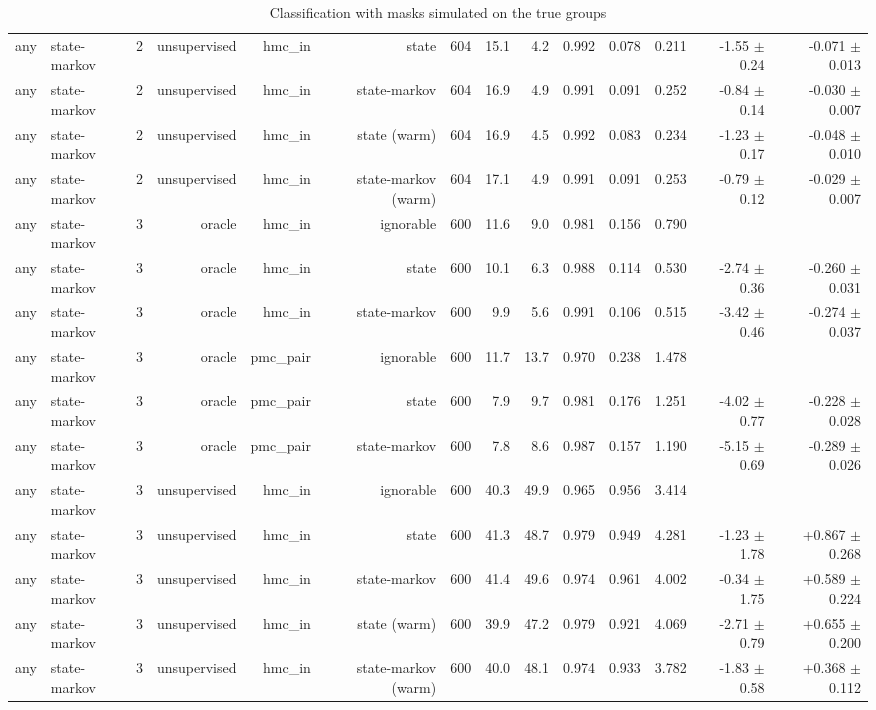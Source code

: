 \begin{table}[ht]
\begin{tabular}{llrrrrrrrrrrrr}
any & state-markov & 2 & unsupervised & hmc\_in & state & 604 & 15.1 & 4.2 & 0.992 & 0.078 & 0.211 & -1.55 $\pm$ 0.24 & -0.071 $\pm$ 0.013 \\
any & state-markov & 2 & unsupervised & hmc\_in & state-markov & 604 & 16.9 & 4.9 & 0.991 & 0.091 & 0.252 & -0.84 $\pm$ 0.14 & -0.030 $\pm$ 0.007 \\
any & state-markov & 2 & unsupervised & hmc\_in & state (warm) & 604 & 16.9 & 4.5 & 0.992 & 0.083 & 0.234 & -1.23 $\pm$ 0.17 & -0.048 $\pm$ 0.010 \\
any & state-markov & 2 & unsupervised & hmc\_in & state-markov (warm) & 604 & 17.1 & 4.9 & 0.991 & 0.091 & 0.253 & -0.79 $\pm$ 0.12 & -0.029 $\pm$ 0.007 \\
any & state-markov & 3 & oracle & hmc\_in & ignorable & 600 & 11.6 & 9.0 & 0.981 & 0.156 & 0.790 &  &  \\
any & state-markov & 3 & oracle & hmc\_in & state & 600 & 10.1 & 6.3 & 0.988 & 0.114 & 0.530 & -2.74 $\pm$ 0.36 & -0.260 $\pm$ 0.031 \\
any & state-markov & 3 & oracle & hmc\_in & state-markov & 600 & 9.9 & 5.6 & 0.991 & 0.106 & 0.515 & -3.42 $\pm$ 0.46 & -0.274 $\pm$ 0.037 \\
any & state-markov & 3 & oracle & pmc\_pair & ignorable & 600 & 11.7 & 13.7 & 0.970 & 0.238 & 1.478 &  &  \\
any & state-markov & 3 & oracle & pmc\_pair & state & 600 & 7.9 & 9.7 & 0.981 & 0.176 & 1.251 & -4.02 $\pm$ 0.77 & -0.228 $\pm$ 0.028 \\
any & state-markov & 3 & oracle & pmc\_pair & state-markov & 600 & 7.8 & 8.6 & 0.987 & 0.157 & 1.190 & -5.15 $\pm$ 0.69 & -0.289 $\pm$ 0.026 \\
any & state-markov & 3 & unsupervised & hmc\_in & ignorable & 600 & 40.3 & 49.9 & 0.965 & 0.956 & 3.414 &  &  \\
any & state-markov & 3 & unsupervised & hmc\_in & state & 600 & 41.3 & 48.7 & 0.979 & 0.949 & 4.281 & -1.23 $\pm$ 1.78 & +0.867 $\pm$ 0.268 \\
any & state-markov & 3 & unsupervised & hmc\_in & state-markov & 600 & 41.4 & 49.6 & 0.974 & 0.961 & 4.002 & -0.34 $\pm$ 1.75 & +0.589 $\pm$ 0.224 \\
any & state-markov & 3 & unsupervised & hmc\_in & state (warm) & 600 & 39.9 & 47.2 & 0.979 & 0.921 & 4.069 & -2.71 $\pm$ 0.79 & +0.655 $\pm$ 0.200 \\
any & state-markov & 3 & unsupervised & hmc\_in & state-markov (warm) & 600 & 40.0 & 48.1 & 0.974 & 0.933 & 3.782 & -1.83 $\pm$ 0.58 & +0.368 $\pm$ 0.112 \\
\bottomrule
\end{tabular}
\caption{Classification with masks simulated on the true groups}
\end{table}
